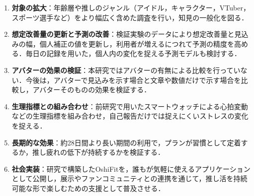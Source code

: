 \begin{enumerate}
\item \textbf{対象の拡大}：年齢層や推しのジャンル（アイドル，キャラクター，VTuber，スポーツ選手など）をより幅広く含めた調査を行い，知見の一般化を図る．
\item \textbf{想定改善量の更新と予測の改善}：検証実験のデータにより想定改善量と見込みの幅，個人補正の値を更新し，利用者が増えるにつれて予測の精度を高める．毎日の記録を用いた，個人内の変化を捉える予測モデルも検討する．
\item \textbf{アバターの効果の検証}：本研究ではアバターの有無による比較を行っていない．今後は，アバターで見込みを示す場合と文章や数値だけで示す場合を比較し，アバターそのものの効果を検証する．
\item \textbf{生理指標との組み合わせ}：前研究で用いたスマートウォッチによる心拍変動\cite{thayer2007}などの生理指標を組み合わせ，自己報告だけでは捉えにくいストレスの変化を捉える．
\item \textbf{長期的な効果}：約28日間より長い期間の利用で，プランが習慣として定着するか，推し疲れの低下が持続するかを検証する．
\item \textbf{社会実装}：研究で構築したOshiFitを，誰もが気軽に使えるアプリケーションとして公開し，展示やファンコミュニティとの連携を通じて，推し活を持続可能な形で楽しむための支援として普及させる．
\end{enumerate}
